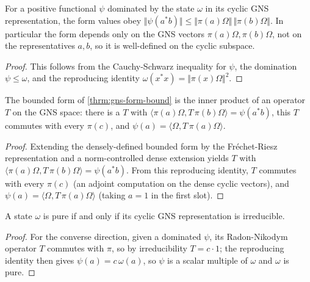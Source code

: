 \begin{theorem}
    \label{thrm:gns-form-bound}
    \leanok
    For a positive functional $\psi$ dominated by the state $\omega$ in its cyclic GNS representation, the form values obey $\Vert\psi(a^* b)\Vert \le \Vert\pi(a)\Omega\Vert\,\Vert\pi(b)\Omega\Vert$. In particular the form depends only on the GNS vectors $\pi(a)\Omega, \pi(b)\Omega$, not on the representatives $a, b$, so it is well-defined on the cyclic subspace.
\end{theorem}
\begin{proof}
    \leanok
    This follows from the Cauchy-Schwarz inequality for $\psi$, the domination $\psi \le \omega$, and the reproducing identity $\omega(x^* x) = \Vert\pi(x)\Omega\Vert^2$.
\end{proof}

\begin{theorem}
    \label{thrm:gns-radon-nikodym-operator}
    \leanok
    The bounded form of \ref{thrm:gns-form-bound} is the inner product of an operator $T$ on the GNS space: there is a $T$ with $\langle \pi(a)\Omega, T\,\pi(b)\Omega\rangle = \psi(a^* b)$, this $T$ commutes with every $\pi(c)$, and $\psi(a) = \langle \Omega, T\,\pi(a)\Omega\rangle$.
\end{theorem}
\begin{proof}
    \leanok
    Extending the densely-defined bounded form by the Fréchet-Riesz representation and a norm-controlled dense extension yields $T$ with $\langle \pi(a)\Omega, T\,\pi(b)\Omega\rangle = \psi(a^* b)$. From this reproducing identity, $T$ commutes with every $\pi(c)$ (an adjoint computation on the dense cyclic vectors), and $\psi(a) = \langle \Omega, T\,\pi(a)\Omega\rangle$ (taking $a = 1$ in the first slot).
\end{proof}

\begin{theorem}
    \label{thrm:pure-iff-irreducible}
    \leanok
    A state $\omega$ is pure if and only if its cyclic GNS representation is irreducible.
\end{theorem}
\begin{proof}
    \leanok
    For the converse direction, given a dominated $\psi$, its Radon-Nikodym operator $T$ commutes with $\pi$, so by irreducibility $T = c \cdot 1$; the reproducing identity then gives $\psi(a) = c\,\omega(a)$, so $\psi$ is a scalar multiple of $\omega$ and $\omega$ is pure.
\end{proof}

